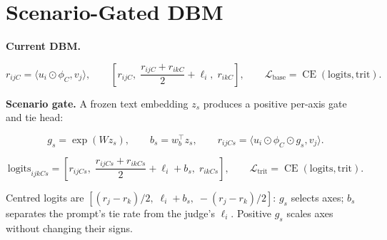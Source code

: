 \documentclass[10pt]{article}
\begin{document}
\section*{Scenario-Gated DBM}

\textbf{Current DBM.}

\[
r_{ijC}=\langle u_i\odot\phi_C,v_j\rangle,\qquad
\left[r_{ijC},\;\frac{r_{ijC}+r_{ikC}}{2}+\ell_i,\;r_{ikC}\right],
\qquad
\mathcal L_{\mathrm{base}}=\operatorname{CE}(\text{logits},\text{trit}).
\]

\textbf{Scenario gate.} A frozen text embedding $z_s$ produces a positive per-axis gate and tie head:

\[
g_s=\exp(Wz_s),\qquad b_s=w_b^\top z_s,\qquad
r_{ijCs}=\langle u_i\odot\phi_C\odot g_s,v_j\rangle.
\]

\[
\text{logits}_{ijkCs}
=\left[r_{ijCs},\;\frac{r_{ijCs}+r_{ikCs}}{2}+\ell_i+b_s,\;r_{ikCs}\right],
\qquad
\mathcal L_{\mathrm{trit}}=\operatorname{CE}(\text{logits},\text{trit}).
\]

Centred logits are $[(r_j-r_k)/2,\;\ell_i+b_s,\;-(r_j-r_k)/2]$: $g_s$ selects axes; $b_s$ separates the prompt's tie rate from the judge's $\ell_i$. Positive $g_s$ scales axes without changing their signs.

\end{document}
